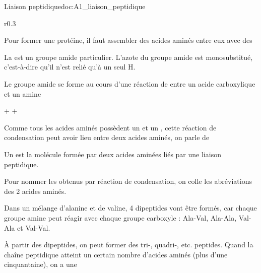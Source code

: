 \begin{doc}{Liaison peptidique}{doc:A1_liaison_peptidique}
  \begin{wrapfigure}[3]{r}{0.3\linewidth}
    \centering

  \end{wrapfigure}
  
  Pour former une protéine, il faut assembler des acides aminés entre eux avec des 

  \begin{importants}
    La  est un groupe amide particulier.
    L'azote du groupe amide est monosubstitué, c'est-à-dire qu'il n'est relié qu'à un seul H.
  \end{importants}

  Le groupe amide se forme au cours d'une réaction de  entre un acide carboxylique et un amine
  \vspace*{-4pt}
  
  \begin{center}
     +   
    \reaction
     +
  \end{center}
  \vspace*{-4pt}

  Comme tous les acides aminés possèdent un  et un , cette réaction de condensation peut avoir lieu entre deux acides aminés, on parle de 

  \begin{importants}
    Un  est la molécule formée par deux acides aminées liés par une liaison peptidique.
    
    Pour nommer les  obtenus par réaction de condensation, on colle les abréviations des 2 acides aminés.
  \end{importants}

  Dans un mélange  d'alanine et de valine, 4 dipeptides vont être formés, car chaque groupe amine peut réagir avec chaque groupe carboxyle :
  Ala-Val, Ala-Ala, Val-Ala et Val-Val.

  \begin{importants}  
    À partir des dipeptides, on peut former des tri-, quadri-, etc. peptides.
    Quand la chaîne peptidique atteint un certain nombre d'acides aminés (plus d'une cinquantaine), on a une 
  \end{importants}
\end{doc}

